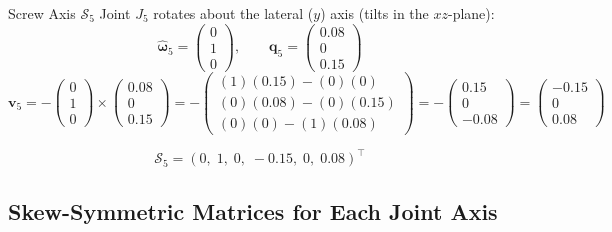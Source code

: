 \documentclass[12pt,a4paper]{article}
\newcommand{\vect}[1]{\bm{#1}}
\begin{document}
\begin{mathbox}{Screw Axis $\mathcal{S}_5$}
Joint $J_5$ rotates about the lateral ($y$) axis (tilts in the $xz$-plane):
\[
  \vect{\hat\omega}_5 = \begin{pmatrix}0\\1\\0\end{pmatrix}, \qquad
  \vect{q}_5 = \begin{pmatrix}0.08\\0\\0.15\end{pmatrix}
\]
\[
  \vect{v}_5
  = -\begin{pmatrix}0\\1\\0\end{pmatrix} \times \begin{pmatrix}0.08\\0\\0.15\end{pmatrix}
  = -\begin{pmatrix}(1)(0.15)-(0)(0)\\(0)(0.08)-(0)(0.15)\\(0)(0)-(1)(0.08)\end{pmatrix}
  = -\begin{pmatrix}0.15\\0\\-0.08\end{pmatrix}
  = \begin{pmatrix}-0.15\\0\\0.08\end{pmatrix}
\]
\end{mathbox}
\[
  \boxed{\mathcal{S}_5 = (0,\;1,\;0,\;-0.15,\;0,\;0.08)^\top}
\]

\subsection{Skew-Symmetric Matrices for Each Joint Axis}
\end{document}
